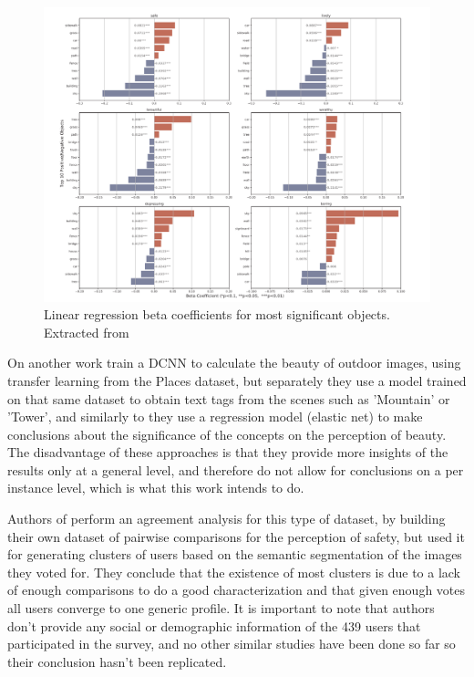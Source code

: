 \begin{figure}[ht]
	\begin{center}
	\includegraphics[width=1\textwidth]{./figures/zhang.png}
	\caption[Beta Coefficients]{ Linear regression beta coefficients for most significant objects. Extracted from  }
	\label{fig:beta}
	\end{center}
\end{figure}

On another work  train a DCNN to calculate the beauty of outdoor images,
using transfer learning from the Places dataset, but separately they use a model trained on that same dataset to obtain text tags from
the scenes such as 'Mountain' or 'Tower', and similarly to  they use a regression model
(elastic net) to make conclusions about the significance of the concepts on the perception of beauty. The disadvantage
of these approaches is that they provide more insights of the results only at a general level, and therefore do not allow for
conclusions on a per instance level, which is what this work intends to do.

Authors of  perform an agreement analysis for this type of dataset,
by building their own dataset of pairwise comparisons for the perception of safety, but used it
for  generating clusters of users based on the semantic segmentation of the images they voted for.
They conclude that the existence of most clusters is due to a lack of enough comparisons to do a good characterization
and that given enough votes all users converge to one generic profile. It is important to note
that authors don't provide any social or demographic information of the 439 users that
participated in the survey, and no other similar studies have been done so
far so their conclusion hasn't been replicated.

